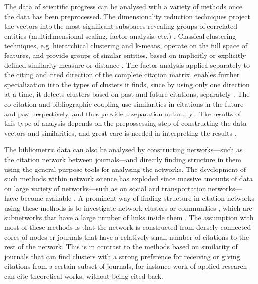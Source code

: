 \documentclass[a4paper,12pt]{article}
\begin{document}
The data of scientific progress can be analysed with a variety of methods once the data has been preprocessed. The dimensionality reduction techniques 
project the vectors into the most significant subspaces
revealing groups of correlated entities (multidimensional scaling, factor analysis, etc.) \citep{Small1999,Leydesdorff2013}.
Classical clustering techniques, e.g. hierarchical clustering and k-means,
operate on the full space of features, and provide groups of similar entities,
based on implicitly or explicitly defined similarity measure or distance
\citep{Punj1983,Modha2000,Boyack2005,Silva2013}.
The factor analysis applied separately to the citing and cited 
direction of the complete 
citation matrix, enables further specialization into the types of clusters it finds,
since by using only one direction at a time, it detects clusters based on 
past and future citations, separately \citep{Leydesdorff2009}.
The co-citation and bibliographic coupling use similarities in citations in the future and past
respectively, and thus provide a separation naturally \citep{Weinberg1974}.
The results of this type of analysis depends on the prepossessing step of constructing the data vectors and similarities, and great care is needed in interpreting the results \citep{Boyack2005,Eck2009}.



The bibliometric data can also be analysed by constructing networks---such as the citation network between journals---and directly finding structure in them using the general purpose tools for analysing the networks.
The development of such methods within network science has exploded since massive amounts of data on large variety of networks---such as on social and transportation networks---have become available \citep{Newman2003,Boccaletti2006}. A prominent way of finding structure in citation networks using these methods is to investigate network clusters or communities \citep{Porter2009Communities,Fortunato2010,Fortunato2016Community}, which are subnetworks that have a large number of links inside them \citep{Rosvall2008,Lambiotte2009,Chen2010,Lancichinetti2012,Radicchi2012}. 
The assumption with most of these methods is that the network is constructed from densely connected cores of nodes or journals that have a relatively small number of citations to the rest of the network. This is in contrast to the methods based on similarity of journals that can find clusters with a strong preference for receiving or giving citations from a certain subset of journals, for instance work of applied research can cite theoretical works, without being cited back. 
\end{document}

